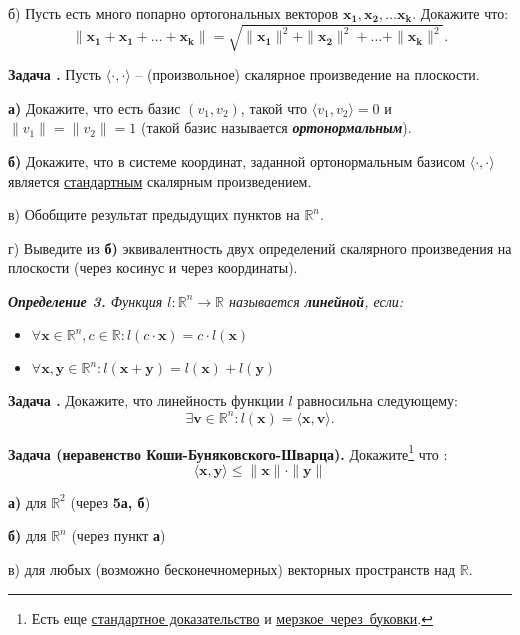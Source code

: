\documentclass[12pt,a4paper]{article}
\def\R{\mathbb{R}}
\newcounter{znum}
\newcommand{\zz}[1]{\addtocounter{znum}{1} \textbf{Задача \arabic{znum}#1. }}
\begin{document}
б) Пусть есть много попарно ортогональных векторов $\mathbf{x_1}, \mathbf{x_2}, \ldots \mathbf{x_k}$. Докажите что: $$\|\mathbf{x_1} + \mathbf{x_1} + \ldots + \mathbf{x_k}\| = \sqrt{\|\mathbf{x_1}\|^2 + \|\mathbf{x_2}\|^2 + \ldots + \|\mathbf{x_k}\|^2}. $$

\zz{} Пусть $\langle \cdot , \cdot \rangle$ -- (произвольное) скалярное произведение на плоскости. \par
\textbf{а)} Докажите, что есть базис $(v_1, v_2)$, такой что $\langle v_1, v_2 \rangle = 0$ и $\|v_1\| = \|v_2\| = 1$ (такой базис называется {\it \textbf{ортонормальным}}).\par
\textbf{б)} Докажите, что в системе координат, заданной ортонормальным базисом  $\langle \cdot , \cdot \rangle$ является \underline{стандартным} скалярным произведением.\par
в) Обобщите результат предыдущих пунктов на $\R^n$.\par
г) Выведите из \textbf{б)} эквивалентность двух определений скалярного произведения на плоскости (через косинус и через координаты).

{\it \textbf{Определение 3.} Функция $l: \R^ n \to \R$ называется \textbf{линейной}, если:
	\begin{itemize}
		\item $\forall \mathbf{x} \in \R^n, c \in \R : l(c \cdot \mathbf{x}) = c \cdot l(\mathbf{x})$
		\item $\forall \mathbf{x}, \mathbf{y} \in \R^n : l(\mathbf{x} + \mathbf{y}) = l(\mathbf{x}) + l(\mathbf{y})$
	\end{itemize}
}

\zz{} Докажите, что линейность функции $l$ равносильна следующему:
$$ \exists \mathbf{v} \in \R^n : l(\mathbf{x}) = \langle \mathbf{x}, \mathbf{v}\rangle.$$


\zz{ (неравенство Коши-Буняковского-Шварца)} Докажите\footnote{
	Есть еще \href{https://ru.wikipedia.org/wiki/\%D0\%9D\%D0\%B5\%D1\%80\%D0\%B0\%D0\%B2\%D0\%B5\%D0\%BD\%D1\%81\%D1\%82\%D0\%B2\%D0\%BE\_\%D0\%9A\%D0\%BE\%D1\%88\%D0\%B8\_\%E2\%80\%94\_\%D0\%91\%D1\%83\%D0\%BD\%D1\%8F\%D0\%BA\%D0\%BE\%D0\%B2\%D1\%81\%D0\%BA\%D0\%BE\%D0\%B3\%D0\%BE\#\%D0\%94\%D0\%BE\%D0\%BA\%D0\%B0\%D0\%B7\%D0\%B0\%D1\%82\%D0\%B5\%D0\%BB\%D1\%8C\%D1\%81\%D1\%82\%D0\%B2\%D0\%BE}{стандартное доказательство} и 
	\href{https://zftsh.online/public/folder\_attachment/a0/a9/a8f7\_061b.pdf?c=006f}{мерзкое~через~буковки}.} что :
$$ \langle \mathbf{x}, \mathbf{y} \rangle  \leqslant \|\mathbf{x}\| \cdot \|\mathbf{y}\|$$\par
\textbf{а)} для $\R^2$ (через \textbf{5а, б})\par
\textbf{б)} для $\R^n$ (через пункт \textbf{а})\par
в) для любых (возможно бесконечномерных) векторных пространств над $\R$.
\end{document}
